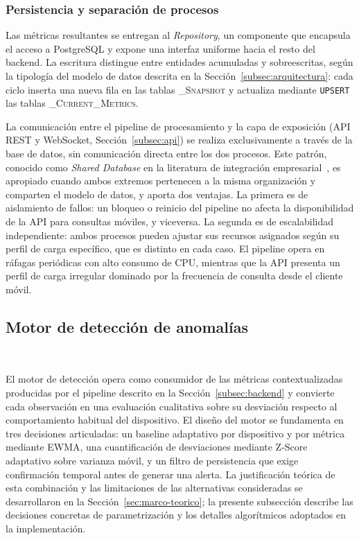\subsubsection{Persistencia y separación de procesos}

Las métricas resultantes se entregan al \textit{Repository}, un 
componente que encapsula el acceso a PostgreSQL y expone una 
interfaz uniforme hacia el resto del backend. La escritura 
distingue entre entidades acumuladas y sobreescritas, según la 
tipología del modelo de datos descrita en la Sección~\ref{subsec:arquitectura}: 
cada ciclo inserta una nueva fila en 
las tablas \textsc{\_Snapshot} y actualiza mediante \texttt{UPSERT} 
las tablas \textsc{\_Current\_Metrics}.

La comunicación entre el pipeline de procesamiento y la capa de 
exposición (API REST y WebSocket, Sección~\ref{subsec:api}) se 
realiza exclusivamente a través de la base de datos, sin 
comunicación directa entre los dos procesos. Este patrón, 
conocido como \textit{Shared Database} en la literatura de 
integración empresarial~\cite{hohpe2003eip}, es apropiado cuando 
ambos extremos pertenecen a la misma organización y comparten el 
modelo de datos, y aporta dos ventajas. La primera es de 
aislamiento de fallos: un bloqueo o reinicio del pipeline no 
afecta la disponibilidad de la API para consultas móviles, y 
viceversa. La segunda es de escalabilidad independiente: ambos 
procesos pueden ajustar sus recursos asignados según su perfil de 
carga específico, que es distinto en cada caso. El pipeline opera 
en ráfagas periódicas con alto consumo de CPU, mientras que la 
API presenta un perfil de carga irregular dominado por la 
frecuencia de consulta desde el cliente móvil.

\subsection{Motor de detección de anomalías}
~\label{subsec:motor}

El motor de detección opera como consumidor de las métricas 
contextualizadas producidas por el pipeline descrito en la Sección~\ref{subsec:backend} 
y convierte cada observación en una 
evaluación cualitativa sobre su desviación respecto al comportamiento 
habitual del dispositivo. El diseño del motor se fundamenta en tres 
decisiones articuladas: un baseline adaptativo por dispositivo y por 
métrica mediante EWMA, una cuantificación de desviaciones mediante 
Z-Score adaptativo sobre varianza móvil, y un filtro de persistencia 
que exige confirmación temporal antes de generar una alerta. La 
justificación teórica de esta combinación y las limitaciones de las 
alternativas consideradas se desarrollaron en la Sección~\ref{sec:marco-teorico}; 
la presente subsección describe las 
decisiones concretas de parametrización y los detalles algorítmicos 
adoptados en la implementación.

